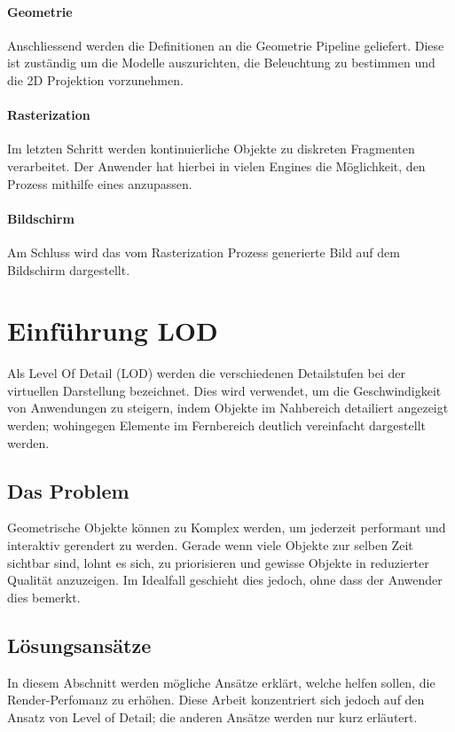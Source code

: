 \paragraph{Geometrie}
Anschliessend werden die Definitionen an die Geometrie Pipeline geliefert. Diese ist zuständig um die Modelle auszurichten, die Beleuchtung zu bestimmen und die 2D Projektion vorzunehmen.

\paragraph{Rasterization}
Im letzten Schritt werden kontinuierliche Objekte zu diskreten Fragmenten verarbeitet. Der Anwender hat hierbei in vielen Engines die Möglichkeit, den Prozess mithilfe eines  anzupassen.

\paragraph{Bildschirm}
Am Schluss wird das vom Rasterization Prozess generierte Bild auf dem Bildschirm dargestellt.

\section{Einführung LOD}
Als Level Of Detail (LOD) werden die verschiedenen Detailstufen bei der virtuellen Darstellung bezeichnet.
Dies wird verwendet, um die Geschwindigkeit von Anwendungen zu steigern, indem Objekte im Nahbereich detailiert angezeigt werden; wohingegen Elemente im Fernbereich deutlich vereinfacht dargestellt werden.

\subsection{Das Problem}
Geometrische Objekte können zu Komplex werden, um jederzeit performant und interaktiv gerendert zu werden.
Gerade wenn viele Objekte zur selben Zeit sichtbar sind, lohnt es sich, zu priorisieren und gewisse Objekte in reduzierter Qualität anzuzeigen.
Im Idealfall geschieht dies jedoch, ohne dass der Anwender dies bemerkt.

\subsection{Lösungsansätze}
In diesem Abschnitt werden mögliche Ansätze erklärt, welche helfen sollen, die Render-Perfomanz zu erhöhen. Diese Arbeit konzentriert sich jedoch auf den Ansatz von Level of Detail; die anderen Ansätze werden nur kurz erläutert.

